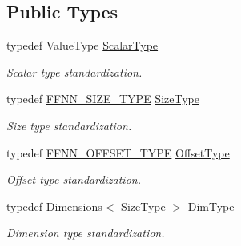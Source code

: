 \subsection*{Public Types}
\begin{DoxyCompactItemize}
\item 
typedef Value\-Type \hyperlink{classffnn_1_1layer_1_1internal_1_1_interface_a7f834e3365e5199bcbcd16d9abd63941}{Scalar\-Type}
\begin{DoxyCompactList}\small\item\em Scalar type standardization. \end{DoxyCompactList}\item 
typedef \hyperlink{global_8h_aab5a5a098c5bf31f4176f4a141d2ef65}{F\-F\-N\-N\-\_\-\-S\-I\-Z\-E\-\_\-\-T\-Y\-P\-E} \hyperlink{classffnn_1_1layer_1_1internal_1_1_interface_af0567642f60c65b5e87067226a54174b}{Size\-Type}
\begin{DoxyCompactList}\small\item\em Size type standardization. \end{DoxyCompactList}\item 
typedef \hyperlink{global_8h_af04b6e835b960cffc7ed05dfd1685ba0}{F\-F\-N\-N\-\_\-\-O\-F\-F\-S\-E\-T\-\_\-\-T\-Y\-P\-E} \hyperlink{classffnn_1_1layer_1_1internal_1_1_interface_adc5bb454329ebd51ac26579a43c006fd}{Offset\-Type}
\begin{DoxyCompactList}\small\item\em Offset type standardization. \end{DoxyCompactList}\item 
typedef \hyperlink{structffnn_1_1layer_1_1internal_1_1_dimensions}{Dimensions}$<$ \hyperlink{classffnn_1_1layer_1_1internal_1_1_interface_af0567642f60c65b5e87067226a54174b}{Size\-Type} $>$ \hyperlink{classffnn_1_1layer_1_1internal_1_1_interface_a8d121d0103f254b51e48f7b20a17681f}{Dim\-Type}
\begin{DoxyCompactList}\small\item\em Dimension type standardization. \end{DoxyCompactList}\end{DoxyCompactItemize}
